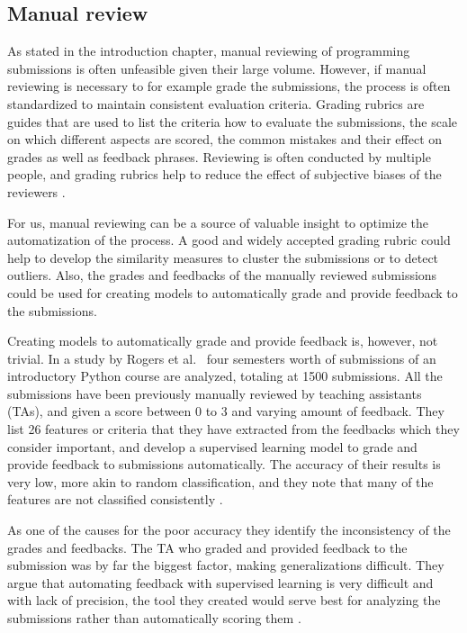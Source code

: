 \subsection{Manual review}
\label{ssec:manual-review}

As stated in the introduction chapter, manual reviewing of programming submissions is often unfeasible given their large volume. However, if manual reviewing is necessary to for example grade the submissions, the process is often standardized to maintain consistent evaluation criteria. Grading rubrics are guides that are used to list the criteria how to evaluate the submissions, the scale on which different aspects are scored, the common mistakes and their effect on grades as well as feedback phrases. Reviewing is often conducted by multiple people, and grading rubrics help to reduce the effect of subjective biases of the reviewers \cite{zimmaro-rubrics-2004, aalto-rubyric-2009}.

For us, manual reviewing can be a source of valuable insight to optimize the automatization of the process. A good and widely accepted grading rubric could help to develop the similarity measures to cluster the submissions or to detect outliers. Also, the grades and feedbacks of the manually reviewed submissions could be used for creating models to automatically grade and provide feedback to the submissions.

Creating models to automatically grade and provide feedback is, however, not trivial. In a study by Rogers et al.~\cite{rogers-auto-style-2014} four semesters worth of submissions of an introductory Python course are analyzed, totaling at 1500 submissions. All the submissions have been previously manually reviewed by teaching assistants (TAs), and given a score between 0 to 3 and varying amount of feedback. They list 26 features or criteria that they have extracted from the feedbacks which they consider important, and develop a supervised learning model to grade and provide feedback to submissions automatically. The accuracy of their results is very low, more akin to random classification, and they note that many of the features are not classified consistently \cite{rogers-auto-style-2014}.

As one of the causes for the poor accuracy they identify the inconsistency of the grades and feedbacks. The TA who graded and provided feedback to the submission was by far the biggest factor, making generalizations difficult. They argue that automating feedback with supervised learning is very difficult and with lack of precision, the tool they created would serve best for analyzing the submissions rather than automatically scoring them \cite{rogers-auto-style-2014}.

